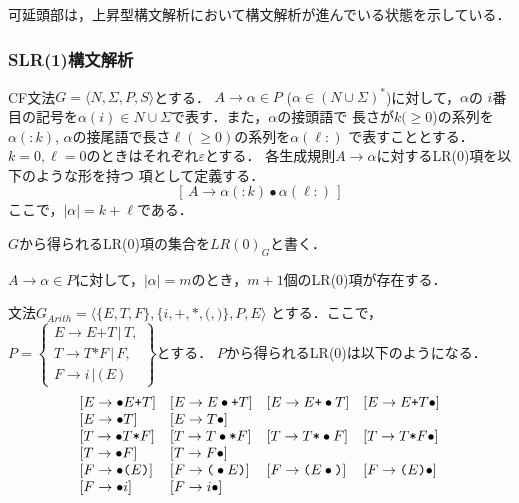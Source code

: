 \documentclass[dvipdfmx,a4j]{jbook}
\begin{document}
可延頭部は，上昇型構文解析において構文解析が進んでいる状態を示している．
\subsubsection{SLR(1)構文解析}

\begin{Def}
  CF文法$G=\langle N,\Sigma,P,S\rangle$とする．
$A\rightarrow\alpha\in P$ ($\alpha\in(N\cup\Sigma)^\ast$)に対して，$\alpha$の
$i$番目の記号を$\alpha(i)\in N\cup\Sigma$で表す．また，$\alpha$の接頭語で
長さが$k(\geq 0$)の系列を$\alpha(:k)$, $\alpha$の接尾語で長さ$\ell(\geq 0)$の系列を$\alpha(\ell:)$
で表すこととする．$k=0,\ell=0$のときはそれぞれ$\varepsilon$とする．
各生成規則$A\rightarrow\alpha$に対するLR(0)項を以下のような形を持つ
項として定義する．
\[[\,A\rightarrow\alpha(:k)\bullet\alpha(\ell:)\,]\]
ここで，$|\alpha|=k+\ell$である．

$G$から得られるLR(0)項の集合を$LR(0)_G$と書く．
\end{Def}

$A\rightarrow\alpha\in P$に対して，$|\alpha|=m$のとき，$m+1$個のLR(0)項が存在する．
\begin{Exmp}\label{ArithmeticExample}
  文法$G_{Arith}=\langle\{E,T,F\},\{i,\texttt{+},\texttt{*},\texttt{(},\texttt{)}\},P,E\rangle$
  とする．ここで，\\$P=\left\{\begin{array}{l}
    E\rightarrow E\texttt{+}T\,|\,T,\\
    T\rightarrow T\texttt{*}F\,|\,F,\\
  F\rightarrow i\,|\,\texttt{(}\,E\,\texttt{)}
  \end{array}\right\}$とする．
  $P$から得られるLR(0)は以下のようになる．
  \[\begin{array}{llll}
    [E\rightarrow\bullet E\texttt{+}T] & [E\rightarrow E\bullet\texttt{+}T]
    & [E\rightarrow E\texttt{+}\bullet T] & [E\rightarrow E\texttt{+}T\bullet]\\\relax
    [E\rightarrow\bullet T] & [E\rightarrow T\bullet]\\\relax
    [T\rightarrow\bullet T\texttt{*}F] & [T\rightarrow T\bullet\texttt{*}F]
    & [T\rightarrow T\texttt{*}\bullet F] & [T\rightarrow T\texttt{*}F\bullet]\\\relax
    [T\rightarrow\bullet F] & [T\rightarrow F\bullet]\\\relax
    [F\rightarrow\bullet\texttt{(}E\texttt{)}] & [F\rightarrow\texttt{(}\bullet E\texttt{)}]
    & [F\rightarrow\texttt{(}E\bullet\texttt{)}] & [F\rightarrow\texttt{(}E\texttt{)}\bullet]\\\relax
    [F\rightarrow\bullet i] & [F\rightarrow i\bullet]
  \end{array}\]
\end{Exmp}
\end{document}
